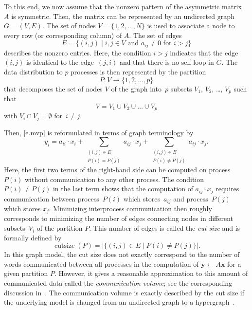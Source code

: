 \documentclass[11pt, twoside,a4paper]{book}
\newcommand{\mat}[1]{\ensuremath{#1}}
\newcommand{\vek}[1]{{\ensuremath{\mathbf #1}}}
\begin{document}
To this end, we now assume that the nonzero pattern of the asymmetric matrix \mat{A} is
symmetric. Then, the matrix can be represented by an undirected graph $G=(V,E)$. The set
of nodes $V = \{ 1, 2, \dots, N\}$ is used to associate a node to every row (or
corresponding column) of \mat{A}. The set of edges
\begin{displaymath}
E = \{ (i,j) \mid i, j \in V \text{ and } a_{ij} \neq 0 \text{ for } i > j \}
\end{displaymath}
describes the nonzero entries. Here, the condition $i>j$ indicates that the edge~$(i,j)$
is identical to the edge~$(j,i)$ and that there is no self-loop in $G$. The data
distribution to $p$ processes is then represented by the partition
$$
P: V \rightarrow \{1, 2, \dots, p\}
$$
that decomposes the set of nodes $V$ of the graph into~$p$ subsets $V_1$, $V_2$, \dots,
$V_p$ such that
$$
V = V_1 \cup V_2 \cup \dots \cup V_p
$$
with $V_i \cap V_j = \emptyset$ for~$i \neq j$.


Then, \eqref{e.mvp} is reformulated in terms of graph terminology by
\begin{displaymath}
y_i = a_{ii} \cdot x_i +
\sum_{ \substack{(i,j)\in E \\ P(i)=P(j)}} a_{ij} \cdot x_j
+ \sum_{ \substack{(i,j)\in E \\ P(i)\neq P(j)}} a_{ij} \cdot x_j .
\end{displaymath}
Here, the first two terms of the right-hand side can be computed on process~$P(i)$
without communication to any other process. The condition~$P(i)\neq P(j)$ in the last
term shows that the computation of $a_{ij} \cdot x_j$ requires communication between
process~$P(i)$ which stores~$a_{ij}$ and process~$P(j)$ which stores $x_j$. Minimizing
interprocess communication then roughly corresponds to minimizing the number of edges
connecting nodes in different subsets~$V_i$ of the partition $P$. This number of edges is
called the \emph{cut size} and is formally defined by
\begin{equation}\label{e.cut}
\operatorname{cutsize}(P) = \bigl| \{ (i,j) \in E \mid P(i)\neq P(j) \} \bigr|.
\end{equation}
In this graph model, the cut size does not exactly correspond to the number of words
communicated between all processes in the computation of $\vek{y} \leftarrow \mat{A}
\vek{x}$ for a given partition $P$. However, it gives a reasonable approximation to this
amount of communicated data called the \emph{communication volume}; see the corresponding
discussion in~\cite{hk:mod}. The communication volume is exactly described by the cut
size if the underlying model is changed from an undirected graph to a
hypergraph~\cite{ca:hyp,cua:hyp,ua:rev}.
\end{document}
